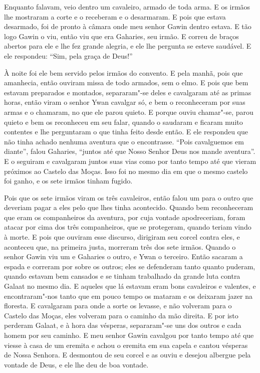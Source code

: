 Enquanto falavam, veio dentro um cavaleiro, armado de toda arma. E os irmãos lhe
mostraram a corte e o receberam e o desarmaram. E pois que estava desarmado,
foi de pronto à câmara onde meu senhor Gawin  dentro estava. E tão logo
Gawin o viu, então viu que era Gaharies, seu irmão. E correu de braços abertos
para ele e lhe fez grande alegria, e ele lhe pergunta se esteve saudável. E ele
respondeu: “Sim, pela graça de Deus!” 

À noite foi ele bem servido pelos irmãos do convento. E pela manhã, pois que
amanhecia, então ouviram missa de todo armados, sem o elmo. E pois que bem
estavam preparados e montados, separaram"-se deles e cavalgaram até as primas
horas, então viram o senhor Ywan cavalgar só, e bem o reconheceram por suas
armas e o chamaram, no que ele parou quieto. E porque ouviu chamar"-se, parou
quieto e bem os reconheceu em seu falar, quando o saudaram e ficaram muito
contentes e lhe perguntaram o que tinha feito desde então. E ele respondeu que
não tinha achado nenhuma aventura que o encontrasse. “Pois cavalguemos em
diante”, falou Gaharies, “juntos até que Nosso Senhor Deus nos mande aventura”.
E o seguiram e cavalgaram juntos suas vias como por tanto tempo até que vieram
próximos ao Castelo das Moças. Isso foi no mesmo dia em que o mesmo castelo foi
ganho, e os sete irmãos tinham fugido. 

Pois que os sete irmãos viram os três cavaleiros, então falou um para o outro
que deveriam pagar a eles pelo que lhes tinha acontecido. Quando bem
reconheceram que eram os companheiros da aventura, por cuja vontade
apodreceriam, foram atacar por cima dos três companheiros, que se protegeram,
quando teriam vindo à morte. E pois que ouviram esse discurso, dirigiram seu
corcel contra eles, e aconteceu que, na primeira justa, morreram três dos sete
irmãos. Quando o senhor Gawin viu um e Gaharies o outro, e Ywan o terceiro.
Então sacaram a espada e correram por sobre os outros; eles se defenderam tanto
quanto puderam, quando estavam bem cansados e se tinham trabalhado da grande
luta contra Galaat no mesmo dia. E aqueles que lá estavam eram bons cavaleiros
e valentes, e encontraram"-nos tanto que em pouco tempo os mataram e os deixaram
jazer na floresta. E cavalgaram para onde a sorte os levasse, e não volveram
para o Castelo das Moças, eles volveram para o caminho da mão direita. E por
isto perderam Galaat, e à hora das vésperas, separaram"-se uns dos outros e cada
homem por seu caminho. E meu senhor Gawin  cavalgou por tanto tempo até
que viesse à casa de um eremita e achou o eremita em sua capela e cantou
vésperas de Nossa Senhora. E desmontou de seu corcel e as ouviu e desejou
albergue pela vontade de Deus, e ele lhe deu de boa vontade.

